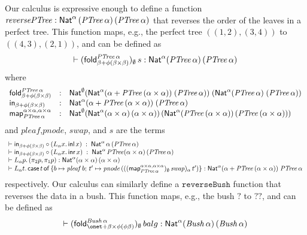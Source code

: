 \documentclass{lmcs}
\theoremstyle{plain}\newtheorem{satz}[thm]{Satz}
\newcommand{\inl}{\mathsf{inl}}
\newcommand{\inr}{\mathsf{inr}}
\newcommand{\fold}{\mathsf{fold}}
\newcommand{\map}{\mathsf{map}}
\begin{document}
Our calculus is expressive enough to define a function
$\mathit{reversePTree :
  \mathsf{Nat}^\alpha\,(\mathit{PTree}\,\alpha)\,(\mathit{PTree}\,\alpha)}$
that reverses the order of the leaves in a perfect tree. This function
maps, e.g., the perfect tree $((1,2),(3,4))$ to $((4,3),(2,1))$, and
can be defined as
\[\vdash (\fold_{\beta + \phi(\beta \times \beta)}^{\mathit{PTree}\,
  \alpha})_\emptyset \, s : \Nat^{\alpha}
(\mathit{PTree}\,\alpha)\,(\mathit{PTree}\,\alpha)\] where
\[\begin{array}{lll}
\fold_{\beta + \phi(\beta \times \beta)}^{\mathit{PTree}\,\alpha} & :
& \Nat^{\emptyset} (\Nat^{\alpha} (\alpha + \mathit{PTree}\,(\alpha
\times \alpha)) \; (\mathit{PTree}\,\alpha))\; (\Nat^{\alpha}
(\mathit{PTree}\,\alpha) \; (\mathit{PTree}\,\alpha))\\
\tin_{\beta + \phi(\beta \times \beta)} & : & \Nat^{\alpha} (\alpha +
\mathit{PTree}\,(\alpha \times \alpha)) \; (\mathit{PTree}\, \alpha)\\
\map_{\mathit{PTree}\,\alpha}^{\alpha \times \alpha, \alpha \times
  \alpha} & : & \Nat^\emptyset
(\Nat^{\alpha} (\alpha \times \alpha)\, (\alpha \times
\alpha))\,
(\Nat^{\alpha} (\mathit{PTree}\,(\alpha \times
\alpha))\, (\mathit{PTree}\,(\alpha \times \alpha)))
\end{array}\]
and 
$\mathit{pleaf}$,$\mathit{pnode}$, $\mathit{swap}$, and $s$ are the terms
\[\begin{array}{l}
\vdash \tin_{\beta + \phi (\beta \times \beta)} \circ (
L_{\alpha} x.\, \inl\, x) \; : \; \Nat^{\alpha}\, \alpha\,
(\mathit{PTree}\,\alpha)\\ 
\vdash \tin_{\beta + \phi (\beta \times \beta)} \circ (
L_{\alpha} x.\, \inr\, x) \; : \; \Nat^{\alpha}\, \mathit{PTree}
(\alpha \times \alpha)\,(\mathit{PTree}\,\alpha)\\ 
\vdash L_{\alpha} p.\, (\pi_2 p, \pi_1 p) :
\Nat^{\alpha} (\alpha \times \alpha)\, (\alpha \times \alpha)\\
\vdash L_{\alpha} t. \,\cse{t}{b \mapsto
 \mathit{pleaf}\, b}{t' \mapsto \mathit{pnode}\, 
    (((\map_{\mathit{PTree}\,\alpha}^{\alpha \times \alpha, \alpha \times
      \alpha})_\emptyset\, \mathit{swap})_\alpha\, t')}
:  \Nat^{\alpha} (\alpha + \mathit{PTree}\,(\alpha \times
\alpha))\; \mathit{PTree}\,\alpha
\end{array}\]
respectively. Our calculus can similarly define a
$\mathtt{reverseBush}$ function that reverses the data in a bush. This
function maps, e.g., {\color{red} the bush $?$ to $??$}, and can be
defined as
\[\vdash (\fold^{\mathit{Bush}\,\alpha}_{\onet + \beta \times \phi (\phi \beta)})_\emptyset\, balg
: \Nat^\alpha (\mathit{Bush}\,\alpha)\,(\mathit{Bush}\,\alpha)\]
\end{document}
